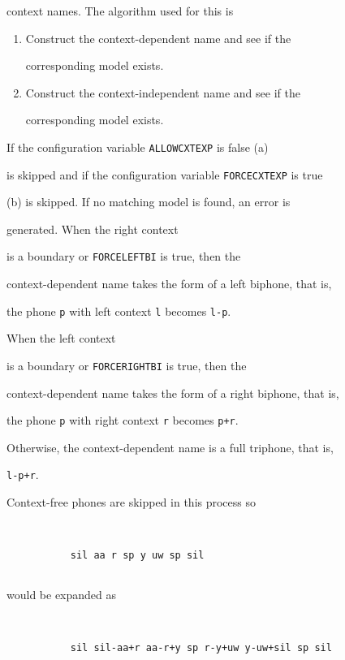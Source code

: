 \begin{enumerate}
context names.  The algorithm used for this is


\begin{enumerate}


\item Construct the context-dependent name and see if the


      corresponding model exists.


\item Construct the context-independent name and see if the


      corresponding  model exists.


\end{enumerate}


If the configuration variable \texttt{ALLOWCXTEXP} is false (a) 


is skipped and if the configuration variable \texttt{FORCECXTEXP} is true


(b) is skipped.  If no matching model is found, an error is


generated.  When the right context


is a boundary or \texttt{FORCELEFTBI} is true, then the


context-dependent name takes the form of a left biphone, that is,


the phone \texttt{p} with left context \texttt{l} becomes \texttt{l-p}. 


When the left context


is a boundary or \texttt{FORCERIGHTBI} is true, then the


context-dependent name takes the form of a right biphone, that is,


the phone \texttt{p} with right context \texttt{r} becomes \texttt{p+r}.


Otherwise, the context-dependent name is a full triphone, that is,


\texttt{l-p+r}.


Context-free phones are skipped in this process so


\begin{verbatim}


           sil aa r sp y uw sp sil


\end{verbatim}


would be expanded as


\begin{verbatim}


           sil sil-aa+r aa-r+y sp r-y+uw y-uw+sil sp sil



\end{verbatim}
\end{enumerate}
